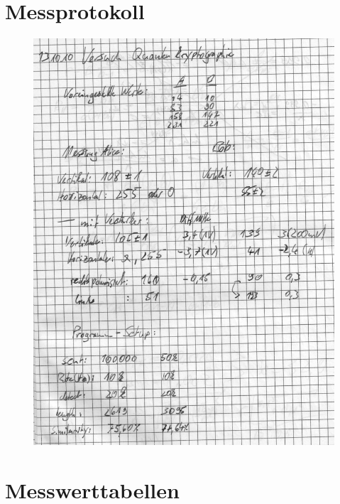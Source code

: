\onecolumn
\section{Messprotokoll}
\label{sec:protokoll}
\begin{figure}[!ht]
        \centering
        \includegraphics[page=1,width=.88\textwidth,keepaspectratio]{../data/messprotokoll}
        \label{fig:protokoll}
\end{figure}

\section{Messwerttabellen}
